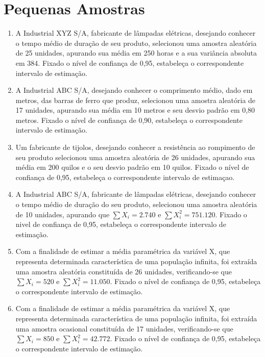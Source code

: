 \chapter{Pequenas Amostras}

\begin{enumerate}[resume]

\item A Industrial XYZ S/A, fabricante de lâmpadas elétricas, desejando conhecer o tempo médio de duração de seu produto, selecionou uma amostra aleatória de 25 unidades, apurando sua média em 250 horas e a sua variância absoluta em 384. Fixado o nível de confiança de 0,95, estabeleça o correspondente intervalo de estimação.

\item A Industrial ABC S/A, desejando conhecer o comprimento médio, dado em metros, das barras de ferro que produz, selecionou uma amostra aleatória de 17 unidades, apurando sua média em 10 metros e seu desvio padrão em 0,80 metros. Fixado o nível de confiança de 0,90, estabeleça o correspondente intervalo de estimação.

\item Um fabricante de tijolos, desejando conhecer a resistência ao rompimento de seu produto selecionou uma amostra aleatória de 26 unidades, apurando sua média em 200 quilos e o seu desvio padrão em 10 quilos. Fixado o nível de confiança de 0,95, estabeleça o correspondente intervalo de estimaçao.

\item A Industrial ABC S/A, fabricante de lâmpadas elétricas, desejando conhecer o tempo médio de duração do seu produto, selecionou uma amostra aleatória de 10 unidades, apurando que  $\sum X_{i} = 2.740$ e  $\sum X_{i}^{2} = 751.120$. Fixado o nivel de confiança de 0,95, estabeleça o correspondente intervalo de estimação.

\item Com a finalidade de estimar a média paramétrica da variável X, que representa determinada característica de uma população infinita, foi extraída uma amostra aleatória constituída de 26 unidades, verificando-se que $\sum X_{i} = 520$ e $\sum X_{i}^{2} = 11.050$. Fixado o nível de confiança de 0,95, estabeleça o correspondente intervalo de estimação.

\item Com a finalidade de estimar a média paramétrica da variável X, que representa determinada característica de uma população infinita, foi extraída uma amostra ocasional constituída de 17 unidades, verificando-se que $\sum X_{i} = 850$ e $\sum X_{i}^{2} = 42. 772$. Fixado o nível de confiança de 0,95, estabeleça o correspondente intervalo de  estimação.


\end{enumerate}
